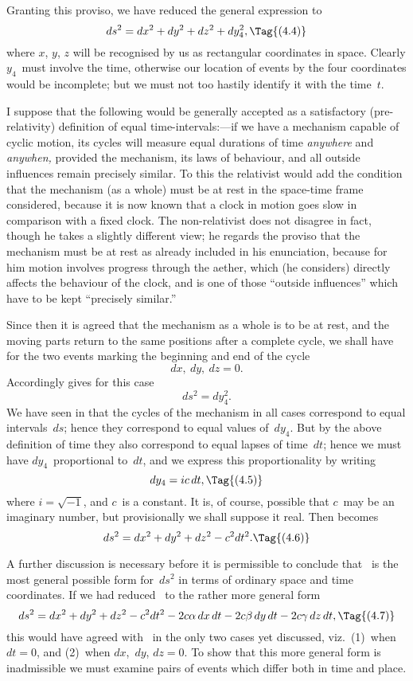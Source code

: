 \documentclass[12pt]{book}
\begin{document}
Granting this proviso, we have reduced the general expression to
\[
ds^2 = dx^2 + dy^2 + dz^2 + dy_4^2,
\Tag{(4.4)}
\]
where $x$, $y$, $z$ will be recognised by us as rectangular coordinates in space.
Clearly $y_4$~must involve the time, otherwise our location of events by the four
coordinates would be incomplete; but we must not too hastily identify it
with the time~$t$.

I suppose that the following would be generally accepted as a satisfactory
(pre\hyp{}relativity) definition of equal time\hyp{}intervals:---if we have a mechanism
%
capable of cyclic motion, its cycles will measure equal durations of time
\emph{anywhere} and \emph{anywhen,} provided the mechanism, its laws of behaviour, and
all outside influences remain precisely similar. To this the relativist would
add the condition that the mechanism (as a whole) must be at rest in the
space-time frame considered, because it is now known that a clock in motion
goes slow in comparison with a fixed clock. The non\hyp{}relativist does not disagree
in fact, though he takes a slightly different view; he regards the proviso
that the mechanism must be at rest as already included in his enunciation,
because for him motion involves progress through the aether, which (he
considers) directly affects the behaviour of the clock, and is one of those
``outside influences'' which have to be kept ``precisely similar.''

Since then it is agreed that the mechanism as a whole is to be at rest,
and the moving parts return to the same positions after a complete cycle, we
shall have for the two events marking the beginning and end of the cycle
\[
dx,\ dy,\ dz = 0.
\]
Accordingly  gives for this case
\[
ds^2 = dy_4^2.
\]
We have seen in  that the cycles of the mechanism in all cases correspond
to equal intervals~$ds$; hence they correspond to equal values of~$dy_4$. But by
the above definition of time they also correspond to equal lapses of time~$dt$;
hence we must have $dy_4$~proportional to~$dt$, and we express this proportionality
by writing
\[
dy_4 = ic\, dt,
\Tag{(4.5)}
\]
where $i = \sqrt{-1}$, and $c$~is a constant. It is, of course, possible that $c$~may be
an imaginary number, but provisionally we shall suppose it real. Then 
becomes
\[
ds^2 = dx^2 + dy^2 + dz^2 - c^2 dt^2.
\Tag{(4.6)}
\]

A further discussion is necessary before it is permissible to conclude that
~is the most general possible form for~$ds^2$ in terms of ordinary space and
time coordinates. If we had reduced~ to the rather more general form
\[
ds^2 = dx^2 + dy^2 + dz^2 - c^2 dt^2 - 2c\alpha\, dx\, dt - 2c\beta\, dy\, dt - 2c\gamma\, dz\, dt,
\Tag{(4.7)}
\]
this would have agreed with~ in the only two cases yet discussed, viz.\
(1)~when $dt = 0$, and (2)~when $dx$,~$dy$, $dz = 0$. To show that this more general
form is inadmissible we must examine pairs of events which differ both in
time and place.
\end{document}
